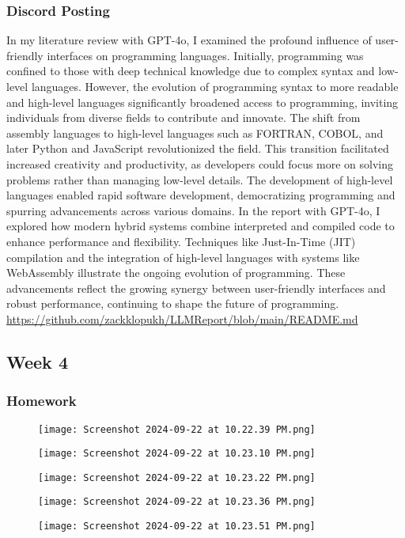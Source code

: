 \documentclass{article}
\theoremstyle{theorem}
\theoremstyle{definition}
\theoremstyle{remark}
\begin{document}
{\subsubsection*{Discord Posting}

In my literature review with GPT-4o, I examined the profound influence of user-friendly interfaces on programming languages. Initially, programming was confined to those with deep technical knowledge due to complex syntax and low-level languages. However, the evolution of programming syntax to more readable and high-level languages significantly broadened access to programming, inviting individuals from diverse fields to contribute and innovate. The shift from assembly languages to high-level languages such as FORTRAN, COBOL, and later Python and JavaScript revolutionized the field. This transition facilitated increased creativity and productivity, as developers could focus more on solving problems rather than managing low-level details. The development of high-level languages enabled rapid software development, democratizing programming and spurring advancements across various domains. In the report with GPT-4o, I explored how modern hybrid systems combine interpreted and compiled code to enhance performance and flexibility. Techniques like Just-In-Time (JIT) compilation and the integration of high-level languages with systems like WebAssembly illustrate the ongoing evolution of programming. These advancements reflect the growing synergy between user-friendly interfaces and robust performance, continuing to shape the future of programming.
\url{https://github.com/zackklopukh/LLMReport/blob/main/README.md}

\subsection{Week 4}

\subsubsection*{Homework}

\begin{figure} [H]
    \centering
    \texttt{[image: Screenshot 2024-09-22 at 10.22.39 PM.png]}
    \label{fig:enter-label}
\end{figure}
\begin{figure} [H]
    \centering
    \texttt{[image: Screenshot 2024-09-22 at 10.23.10 PM.png]}
    \label{fig:enter-label}
\end{figure}
\begin{figure} [H]
    \centering
    \texttt{[image: Screenshot 2024-09-22 at 10.23.22 PM.png]}
    \label{fig:enter-label}
\end{figure}
\begin{figure} [H]
    \centering
    \texttt{[image: Screenshot 2024-09-22 at 10.23.36 PM.png]}
    \label{fig:enter-label}
\end{figure}
\begin{figure} [H]
    \centering
    \texttt{[image: Screenshot 2024-09-22 at 10.23.51 PM.png]}
\label{fig:enter-label}
\end{figure}

}
\end{document}

